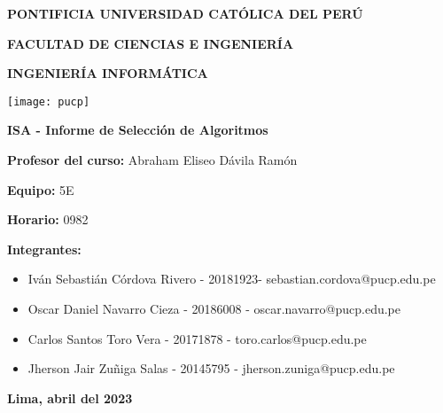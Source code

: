 
\begin{titlepage}
    \begin{center}
        \Large
        \textbf{PONTIFICIA UNIVERSIDAD CATÓLICA DEL PERÚ}

        \textbf{FACULTAD DE CIENCIAS E INGENIERÍA}

        \textbf{INGENIERÍA INFORMÁTICA}

        \vspace{0.5cm}
        \texttt{[image: pucp]}

        \vspace{1.5cm}
        \textbf{ISA - Informe de Selección de Algoritmos}
    \end{center}
    \large
    \vspace{1cm}

    \textbf{Profesor del curso: } Abraham Eliseo Dávila Ramón
    \vspace{0.5cm}

    \textbf{Equipo: } 5E
    \vspace{0.5cm}

    \textbf{Horario: } 0982
    \vspace{0.5cm}

    \textbf{Integrantes:}
    \vspace{0.5cm}

    \begin{itemize}
        \item{Iván Sebastián Córdova Rivero - 20181923- sebastian.cordova@pucp.edu.pe}
        \item{Oscar Daniel Navarro Cieza - 20186008 - oscar.navarro@pucp.edu.pe}
        \item{Carlos Santos Toro Vera - 20171878 - toro.carlos@pucp.edu.pe}
        \item{Jherson Jair Zuñiga Salas - 20145795 - jherson.zuniga@pucp.edu.pe}
    \end{itemize}

    \begin{center}
        \vspace*{2cm}
        \textbf{Lima, abril del 2023}
    \end{center}
\end{titlepage}

